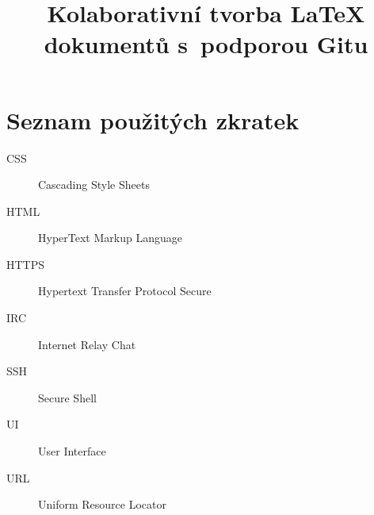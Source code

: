 \documentclass[thesis=B,czech]{FITthesis}[2013/05/06]
\title{Kolaborativní tvorba LaTeX dokumentů s~podporou Gitu}
\begin{document}






















\appendix

\chapter{Seznam použitých zkratek}
\begin{description}
	\item[CSS] Cascading Style Sheets
	\item[HTML] HyperText Markup Language
	\item[HTTPS] Hypertext Transfer Protocol Secure
	\item[IRC] Internet Relay Chat
	\item[SSH] Secure Shell
	\item[UI] User Interface
	\item[URL] Uniform Resource Locator
\end{description}
\end{document}
